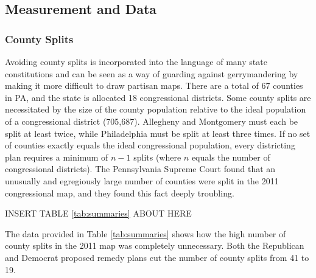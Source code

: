 \subsection*{Measurement and Data}
\subsubsection*{County Splits}
    Avoiding county splits is incorporated into the language of many state constitutions \citep{Grofman1985} and can be seen as a way of guarding against gerrymandering by making it more difficult to draw partisan maps. There are a total of 67 counties in PA, and the state is allocated 18 congressional districts.  Some county splits are necessitated by the size of the county population relative to the ideal population of a congressional district (705,687).  Allegheny and Montgomery must each be split at least twice, while Philadelphia must be split at least three times. If no set of counties exactly equals the ideal congressional population, every districting plan requires a minimum of $n-1$ splits (where $n$ equals the number of congressional districts). The Pennsylvania Supreme Court found that an unusually and egregiously large number of counties were split in the 2011 congressional map, and they found this fact deeply troubling.
\par
 \begin{center} INSERT TABLE \ref{tab:summaries} ABOUT HERE \end{center}
\par
    The data provided in Table \ref{tab:summaries} shows how the high number of county splits in the 2011 map was completely unnecessary. Both the Republican and Democrat proposed remedy plans cut the number of county splits from 41 to 19.
